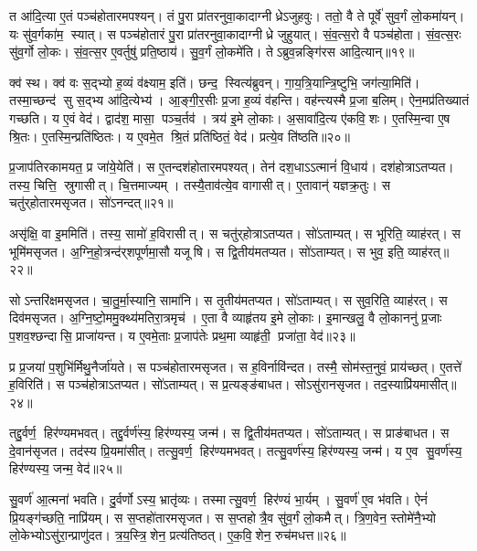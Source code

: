 त आ॑दि॒त्या ए॒तं पञ्च॑होतारमपश्यन्।
तं पु॒रा प्रा॑तरनुवा॒कादाग्नीध्रेऽजुहवुः।
ततो॒ वै ते पूर्वे॑ सुव॒र्गं लो॒कमा॑यन्।
यः सु॑व॒र्गका॑म॒ स्यात्।
स पञ्च॑होतारं पु॒रा प्रा॑तरनुवा॒कादाग्नीध्रे जुहुयात्।
सं॒व॒त्स॒रो वै पञ्च॑होता।
सं॒व॒त्स॒रः सु॑व॒र्गो लो॒कः।
सं॒व॒त्स॒र ए॒वर्तुषु॑ प्रति॒ष्ठाय॑।
सु॒व॒र्गं लो॒कमे॑ति।
तेऽब्रुव॒न्नङ्गि॑रस आदि॒त्यान्॥१९॥

क्व॑ स्थ।
क्व॑ वः स॒द्भ्यो ह॒व्यं व॑क्ष्याम॒ इति॑।
छन्द॒ स्वित्य॑ब्रुवन्।
गा॒य॒त्रि॒यान्त्रि॒ष्टुभि॒ जग॑त्या॒मिति॑।
तस्मा॒च्छन्द॑ सु स॒द्भ्य आ॑दि॒त्येभ्य॑।
आ॒ङ्गी॒र॒सीः प्र॒जा ह॒व्यं व॑हन्ति।
वह॑न्त्यस्मै प्र॒जा ब॒लिम्।
ऐन॒मप्र॑तिख्यातं गच्छति।
य ए॒वं वेद॑।
द्वाद॑श॒ मासा॒ पञ्च॒र्तव॑।
त्रय॑ इ॒मे लो॒काः।
अ॒सावा॑दि॒त्य ए॑कवि॒शः।
ए॒तस्मि॒न्वा ए॒ष श्रि॒तः।
ए॒तस्मि॒न्प्रति॑ष्ठितः।
य ए॒वमे॒त श्रि॒तं प्रति॑ष्ठितं॒ वेद॑।
प्रत्ये॒व ति॑ष्ठति॥२०॥\anuvakamend[स्या॒दिति॑ संवत्स॒रो ज॑नयध्व॒मितीत्य॑ब्रवी॒त्पूर्व॒ इत्या॑दि॒त्यानृ॒तव॒ष्षट्च॑]

प्र॒जाप॑तिरकामयत॒ प्र जा॑ये॒येति॑।
स ए॒तन्दश॑होतारमपश्यत्।
तेन॑ दश॒धाऽऽत्मानं॑ वि॒धाय॑।
दश॑होत्राऽतप्यत।
तस्य॒ चित्ति॒ स्रुगासीत्।
चि॒त्तमाज्यम्।
तस्यै॒ताव॑त्ये॒व वागासीत्।
ए॒तावान्॑ यज्ञक्र॒तुः।
स चतु॑र्‌होतारमसृजत।
सो॑ऽनन्दत्॥२१॥

असृ॑क्षि॒ वा इ॒ममिति॑।
तस्य॒ सामो॑ ह॒विरासीत्।
स चतु॑र्‌होत्राऽतप्यत।
सो॑ऽताम्यत्।
स भूरिति॒ व्याह॑रत्।
स भूमि॑मसृजत।
अ॒ग्नि॒हो॒त्रन्द॑र्‌शपूर्णमा॒सौ यजूषि।
स द्वि॒तीय॑मतप्यत।
सो॑ऽताम्यत्।
स भुव॒ इति॒ व्याह॑रत्॥२२॥

सोऽन्तरि॑क्षमसृजत।
चा॒तु॒र्मा॒स्यानि॒ सामा॑नि।
स तृ॒तीय॑मतप्यत।
सो॑ऽताम्यत्।
स सुव॒रिति॒ व्याह॑रत्।
स दिव॑मसृजत।
अ॒ग्नि॒ष्टो॒ममु॒क्थ्य॑मतिरा॒त्रमृच॑।
ए॒ता वै व्याहृ॑तय इ॒मे लो॒काः।
इ॒मान्खलु॒ वै लो॒काननु॑ प्र॒जाः प॒शव॒श्छन्दासि॒ प्राजा॑यन्त।
य ए॒वमे॒ताः प्र॒जाप॑तेः प्रथ॒मा व्याहृ॑ती॒ प्रजा॑ता॒ वेद॑॥२३॥

प्र प्र॒जया॑ प॒शुभि॑र्मिथु॒नैर्जा॑यते।
स पञ्च॑होतारमसृजत।
स ह॒विर्नावि॑न्दत।
तस्मै॒ सोम॑स्त॒नुवं॒ प्राय॑च्छत्।
ए॒तत्ते॑ ह॒विरिति॑।
स पञ्च॑होत्राऽतप्यत।
सो॑ऽताम्यत्।
स प्र॒त्यङ्ङ॑बाधत।
सोऽसु॑रानसृजत।
तद॒स्याप्रि॑यमासीत्॥२४॥

तद्दु॒र्वर्ण॒ हिर॑ण्यमभवत्।
तद्दु॒र्वर्ण॑स्य॒ हिर॑ण्यस्य॒ जन्म॑।
स द्वि॒तीय॑मतप्यत।
सो॑ऽताम्यत्।
स प्राङ॑बाधत।
स दे॒वान॑सृजत।
तद॑स्य प्रि॒यमा॑सीत्।
तत्सु॒वर्ण॒ हिर॑ण्यमभवत्।
तत्सु॒वर्ण॑स्य॒ हिर॑ण्यस्य॒ जन्म॑।
य ए॒व सु॒वर्ण॑स्य॒ हिर॑ण्यस्य॒ जन्म॒ वेद॑॥२५॥

सु॒वर्ण॑ आ॒त्मना॑ भवति।
दु॒र्वर्णोऽस्य॒ भ्रातृ॑व्यः।
तस्मात्सु॒वर्ण॒ हिर॑ण्यं भा॒र्यम्।
सु॒वर्ण॑ ए॒व भ॑वति।
ऐनं॑ प्रि॒यङ्ग॑च्छति॒ नाप्रि॑यम्।
स स॒प्तहो॑तारमसृजत।
स स॒प्तहोत्रै॒व सु॑व॒र्गं लो॒कमैत्।
त्रि॒ण॒वेन॒ स्तोमे॑नै॒भ्यो लो॒केभ्योऽसु॑रा॒न्प्राणु॑दत।
त्र॒य॒स्त्रि॒शेन॒ प्रत्य॑तिष्ठत्।
ए॒क॒वि॒शेन॒ रुच॑मधत्त॥२६॥

